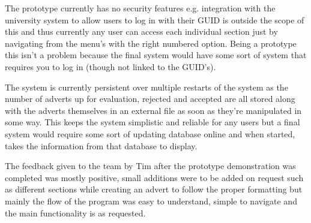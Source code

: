 The prototype currently has no security features e.g. integration with the university system to allow users to log in with their GUID is outside the scope of this and thus currently any user can access each individual section just by navigating from the menu's with the right numbered option. Being a prototype this isn't a problem because the final system would have some sort of system that requires you to log in (though not linked to the GUID's).

The system is currently persistent over multiple restarts of the system as the number of adverts up for evaluation, rejected and accepted are all stored along with the adverts themselves in an external file as soon as they're manipulated in some way. This keeps the system simplistic and reliable for any users but a final system would require some sort of updating database online and when started, takes the information from that database to display.
 
The feedback given to the team by Tim after the prototype demonstration was completed was mostly positive, small additions were to be added on request such as different sections while creating an advert to follow the proper formatting but mainly the flow of the program was easy to understand, simple to navigate and the main functionality is as requested.



